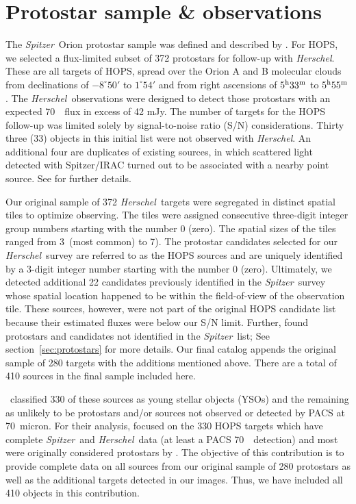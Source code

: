 \documentclass[manuscript]{aastex61}
\newcommand{\herschel}{{\em Herschel}}
\newcommand{\spitzer}{{\em Spitzer}}
\begin{document}
\section{Protostar sample \& observations}
\label{sec:sample}
\par
The \spitzer\ Orion protostar sample was defined and described by \cite{orion}.  For HOPS, we selected a flux-limited subset of 372 protostars for follow-up with \herschel.  These are all targets of HOPS, spread over the Orion A and B molecular clouds from declinations of $-8^\circ50'$ to $1^\circ54'$ and from right ascensions of $5^{\rm h}33^{\rm m}$ to $5^{\rm h}55^{\rm m}$.  The \herschel\ observations were designed to detect those protostars with an expected 70~\micron\ flux in excess of 42 mJy.  The number of targets for the HOPS follow-up was limited solely by signal-to-noise ratio (S/N) considerations.   Thirty three (33) objects in this initial list were not observed with \herschel. An additional four are duplicates of existing sources, in which scattered light detected with Spitzer/IRAC turned out to be associated with a nearby point source.  See \citet{furlan} for further details.
\par
Our original sample of 372 \herschel\ targets were segregated in distinct spatial tiles to optimize observing.  The tiles were assigned consecutive three-digit integer group numbers starting with the number 0 (zero).  The spatial sizes of the tiles ranged from 3\arcmin\ (most common) to 7\arcmin).  The protostar candidates selected for our \herschel\ survey are referred to as the HOPS sources and are uniquely identified by a 3-digit integer number starting with the number 0 (zero).   Ultimately, we detected additional 22 candidates previously identified in the \spitzer\ survey whose spatial location happened to be within the field-of-view of the observation tile.  These sources, however, were not part of the original HOPS candidate list because their estimated fluxes were below our S/N limit.  Further, \cite{pbrpaper} found protostars and candidates not identified in the \spitzer\ list; See section~\ref{sec:protostars} for more details.  Our final catalog appends the original sample of 280 targets with the additions mentioned above.  There are a total of 410 sources in the final sample included here.
\par
\cite{furlan}\ classified 330 of these sources as young stellar objects (YSOs) and the remaining as unlikely to be protostars and/or sources not observed or detected by PACS at 70~micron.  For their analysis, \cite{furlan} focused on the 330 HOPS targets which have complete \spitzer\ and \herschel\ data (at least a PACS 70~\micron\ detection) and most were originally considered protostars by \cite{orion}.  The objective of this contribution is to provide complete data on all sources from our original sample of 280 protostars as well as the additional targets detected in our images.  Thus, we have included all 410 objects in this contribution.
\end{document}
